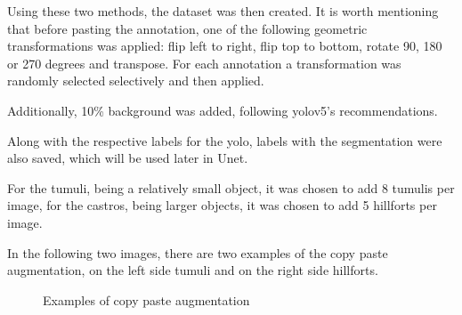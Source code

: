 Using these two methods, the dataset was then created. It is worth mentioning that before pasting the annotation, one of the following geometric transformations was applied: flip left to right, flip top to bottom, rotate 90, 180 or 270 degrees and transpose. For each annotation a transformation was randomly selected selectively and then applied.

Additionally, 10\% background was added, following yolov5's recommendations.

Along with the respective labels for the yolo, labels with the segmentation were also saved, which will be used later in Unet.

For the tumuli, being a relatively small object, it was chosen to add 8 tumulis per image, for the castros, being larger objects, it was chosen to add 5 hillforts per image.

In the following two images, there are two examples of the copy paste augmentation, on the left side tumuli and on the right side hillforts.
\begin{figure}[H]
    \centering
    \qquad
    \caption{Examples of copy paste augmentation}%
\end{figure}

